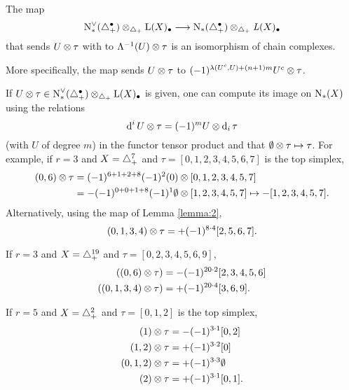 \begin{lemma}\label{lemma:2} The map
	\[
	\operatorname{N}^\vee_{*}(\triangle_{+}^\bullet) \otimes _{\triangle_{+}} \operatorname{L}(X)_\bullet \longrightarrow \operatorname{N}_{*}(\triangle_{+}^\bullet) \otimes _{\triangle_{+}} \operatorname{{\it L}}(X)_\bullet
	\]
	that sends $U \otimes  \tau$ with to $\Lambda^{-1}(U) \otimes  \tau$ is an isomorphism of chain complexes.
\end{lemma}
More specifically, the map sends $U \otimes  \tau$ to $(-1)^{\lambda(U^c,U)+(n+1)m} U^c \otimes  \tau$.
\begin{example}\label{example:first3} If $U \otimes  \tau\in \operatorname{N}^\vee_{*}(\triangle_{+}^\bullet) \otimes _{\triangle_{+}} \operatorname{L}(X)_\bullet$ is given, one can compute its image on $\operatorname{N}_{*}(X)$ using the relations
\[
	\operatorname{d}^i U \otimes  \tau = (-1)^{m} U \otimes  \operatorname{d}_i\tau
\]
 (with $U$ of degree $m$) in the functor tensor product and that $\emptyset  \otimes  \tau \mapsto \tau$. For example, if $r=3$ and $X=\triangle_{+}^7$ and $\tau = [0,1,2,3,4,5,6,7]$ is the top simplex,
\begin{align*}
		(0,6) \otimes  \tau &= (-1)^{6+1+2+8}(-1)^2(0) \otimes  [0,1,2,3,4,5,7]
		\\
		&= -(-1)^{0+0+1+8}(-1)^1\emptyset \otimes  [1,2,3,4,5,7]\mapsto -[1,2,3,4,5,7].
\end{align*}
Alternatively, using the map of Lemma \ref{lemma:2},
\[
	(0,1,3,4) \otimes  \tau = +(-1)^{8\cdot 4}[2,5,6,7].
\]
	\end{example}
	\begin{example}\label{example:first3'} If $r=3$ and $X=\triangle_{+}^{19}$ and $\tau = [0,2,3,4,5,6,9]$,
\begin{align*}
		((0,6) \otimes  \tau) &= -(-1)^{20\cdot 2} [2,3,4,5,6]
		\\
		((0,1,3,4) \otimes  \tau) &= +(-1)^{20\cdot 4}[3,6,9].
	\end{align*}
	\end{example}
	\begin{example}\label{example:first5} If $r=5$ and $X=\triangle_{+}^2$ and $\tau = [0,1,2]$ is the top simplex,
	\[
	\begin{split}
		(1) \otimes  \tau &= - (-1)^{3\cdot 1} [0,2]
		\\
		(1,2) \otimes  \tau &= +(-1)^{3\cdot 2} [0]
		\\
		(0,1,2) \otimes  \tau &= +(-1)^{3\cdot 3}\emptyset
		\\
		(2) \otimes  \tau &= +(-1)^{3\cdot 1} [0,1].
		\end{split}
	\]
	\end{example}

